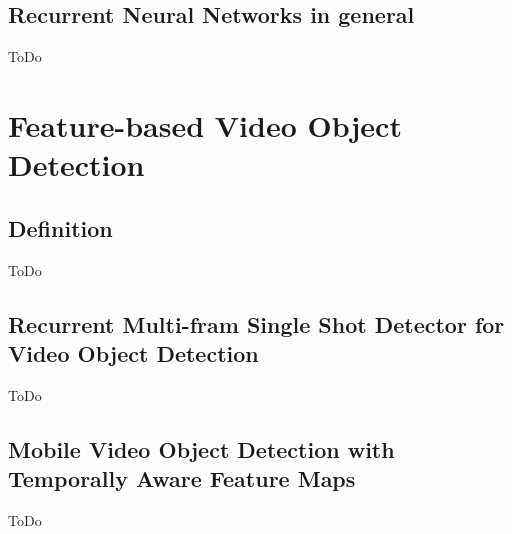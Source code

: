 \documentclass[conference]{IEEEtran}
\begin{document}
\subsection{Recurrent Neural Networks in general}
ToDo


\section{Feature-based Video Object Detection}

\subsection{Definition}
ToDo

\subsection{Recurrent Multi-fram Single Shot Detector for Video Object Detection}
ToDo

\subsection{Mobile Video Object Detection with Temporally Aware Feature Maps}
ToDo
\end{document}
